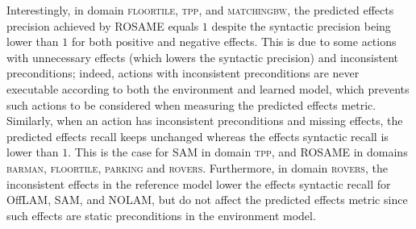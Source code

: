 \documentclass[letterpaper]{article} %
\newcommand{\sam}{\ac{SAM}\xspace}
\newcommand{\nolam}{NOLAM\xspace}
\newcommand{\offlam}{OffLAM\xspace}
\newcommand{\rosame}{ROSAME\xspace}
\newif\ifaddcomments
\newcommand{\leo}[1]{\ifaddcomments{\textcolor{pink}{[Leonardo: #1]}}\fi}
\begin{document}
%
%
Interestingly, in domain \textsc{floortile, tpp}, and \textsc{matchingbw}, the predicted effects precision achieved by \rosame equals $1$ despite the syntactic precision being lower than $1$ for both positive and negative effects. This is due to some actions with unnecessary effects (which lowers the syntactic precision) and inconsistent preconditions; indeed, actions with inconsistent preconditions are never executable according to both the environment and learned model, which prevents such actions to be considered when measuring the predicted effects metric.
Similarly, when an action has inconsistent preconditions and missing effects, the predicted effects recall keeps unchanged whereas the effects syntactic recall is lower than $1$. This is the case for \sam in domain \textsc{tpp}, and \rosame in domains \textsc{barman, floortile, parking} and \textsc{rovers}. Furthermore, in domain \textsc{rovers}, the inconsistent effects in the reference model lower the effects syntactic recall for \offlam, \sam, and \nolam, but do not affect the predicted effects metric since such effects are static preconditions in the environment model.
%

\end{document}
